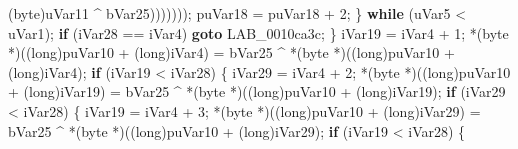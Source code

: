 \documentclass[
]{article}
\newenvironment{Shaded}{}{}
\newcommand{\ControlFlowTok}[1]{\textcolor[rgb]{0.00,0.44,0.13}{\textbf{#1}}}
\newcommand{\DataTypeTok}[1]{\textcolor[rgb]{0.56,0.13,0.00}{#1}}
\newcommand{\DecValTok}[1]{\textcolor[rgb]{0.25,0.63,0.44}{#1}}
\newcommand{\NormalTok}[1]{#1}
\newcommand{\OperatorTok}[1]{\textcolor[rgb]{0.40,0.40,0.40}{#1}}
\begin{document}
\begin{Shaded}
\begin{Highlighting}[]
                                                  \OperatorTok{(}\NormalTok{byte}\OperatorTok{)}\NormalTok{uVar11 }\OperatorTok{\^{}}\NormalTok{ bVar25}\OperatorTok{)))))));}
\NormalTok{        puVar18 }\OperatorTok{=}\NormalTok{ puVar18 }\OperatorTok{+} \DecValTok{2}\OperatorTok{;}
      \OperatorTok{\}} \ControlFlowTok{while} \OperatorTok{(}\NormalTok{uVar5 }\OperatorTok{\textless{}}\NormalTok{ uVar1}\OperatorTok{);}
      \ControlFlowTok{if} \OperatorTok{(}\NormalTok{iVar28 }\OperatorTok{==}\NormalTok{ iVar4}\OperatorTok{)} \ControlFlowTok{goto}\NormalTok{ LAB\_0010ca3c}\OperatorTok{;}
    \OperatorTok{\}}
\NormalTok{    iVar19 }\OperatorTok{=}\NormalTok{ iVar4 }\OperatorTok{+} \DecValTok{1}\OperatorTok{;}
    \OperatorTok{*(}\NormalTok{byte }\OperatorTok{*)((}\DataTypeTok{long}\OperatorTok{)}\NormalTok{puVar10 }\OperatorTok{+} \OperatorTok{(}\DataTypeTok{long}\OperatorTok{)}\NormalTok{iVar4}\OperatorTok{)} \OperatorTok{=}\NormalTok{ bVar25 }\OperatorTok{\^{}} \OperatorTok{*(}\NormalTok{byte }\OperatorTok{*)((}\DataTypeTok{long}\OperatorTok{)}\NormalTok{puVar10 }\OperatorTok{+} \OperatorTok{(}\DataTypeTok{long}\OperatorTok{)}\NormalTok{iVar4}\OperatorTok{);}
    \ControlFlowTok{if} \OperatorTok{(}\NormalTok{iVar19 }\OperatorTok{\textless{}}\NormalTok{ iVar28}\OperatorTok{)} \OperatorTok{\{}
\NormalTok{      iVar29 }\OperatorTok{=}\NormalTok{ iVar4 }\OperatorTok{+} \DecValTok{2}\OperatorTok{;}
      \OperatorTok{*(}\NormalTok{byte }\OperatorTok{*)((}\DataTypeTok{long}\OperatorTok{)}\NormalTok{puVar10 }\OperatorTok{+} \OperatorTok{(}\DataTypeTok{long}\OperatorTok{)}\NormalTok{iVar19}\OperatorTok{)} \OperatorTok{=}\NormalTok{ bVar25 }\OperatorTok{\^{}} \OperatorTok{*(}\NormalTok{byte }\OperatorTok{*)((}\DataTypeTok{long}\OperatorTok{)}\NormalTok{puVar10 }\OperatorTok{+} \OperatorTok{(}\DataTypeTok{long}\OperatorTok{)}\NormalTok{iVar19}\OperatorTok{);}
      \ControlFlowTok{if} \OperatorTok{(}\NormalTok{iVar29 }\OperatorTok{\textless{}}\NormalTok{ iVar28}\OperatorTok{)} \OperatorTok{\{}
\NormalTok{        iVar19 }\OperatorTok{=}\NormalTok{ iVar4 }\OperatorTok{+} \DecValTok{3}\OperatorTok{;}
        \OperatorTok{*(}\NormalTok{byte }\OperatorTok{*)((}\DataTypeTok{long}\OperatorTok{)}\NormalTok{puVar10 }\OperatorTok{+} \OperatorTok{(}\DataTypeTok{long}\OperatorTok{)}\NormalTok{iVar29}\OperatorTok{)} \OperatorTok{=}\NormalTok{ bVar25 }\OperatorTok{\^{}} \OperatorTok{*(}\NormalTok{byte }\OperatorTok{*)((}\DataTypeTok{long}\OperatorTok{)}\NormalTok{puVar10 }\OperatorTok{+} \OperatorTok{(}\DataTypeTok{long}\OperatorTok{)}\NormalTok{iVar29}\OperatorTok{);}
        \ControlFlowTok{if} \OperatorTok{(}\NormalTok{iVar19 }\OperatorTok{\textless{}}\NormalTok{ iVar28}\OperatorTok{)} \OperatorTok{\{}

\end{Highlighting}
\end{Shaded}
\end{document}
